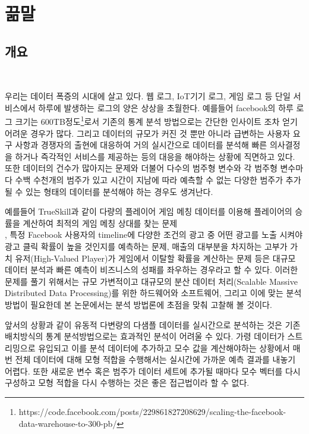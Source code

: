 \documentclass[oneside,b5paper,11pt]{book}
\theoremstyle{plain}
\theoremstyle{definition}
\theoremstyle{remark}
\theoremstyle{definition}
\numberwithin{equation}{chapter}
\begin{document}
%
%
\chapter{끎말}

\section{개요}
{}\

 우리는 데이터 폭증의 시대에 살고 있다. 웹 로그, IoT기기 로그, 게임 로그 등 단일 서비스에서 하루에 발생하는 로그의 양은 상상을 초월한다. 예를들어 facebook의 하루 로그 크기는 600TB정도\footnote{https://code.facebook.com/posts/229861827208629/scaling-the-facebook-data-warehouse-to-300-pb/}로서 기존의 통계 분석 방법으로는 간단한 인사이트 조차 얻기 어려운 경우가 많다. 그리고 데이터의 규모가 커진 것 뿐만 아니라 급변하는 사용자 요구 사항과 경쟁자의 출현에 대응하여 거의 실시간으로 데이터를 분석해 빠른 의사결정을 하거나 즉각적인 서비스를 제공하는 등의 대응을 해야하는 상황에 직면하고 있다. 또한 데이터의 건수가 많아지는 문제와 더불어 다수의 범주형 변수와 각 범주형 변수마다 수백 수천개의 범주가 있고 시간이 지남에 따라 예측할 수 없는 다양한 범주가 추가될 수 있는 형태의 데이터를 분석해야 하는 경우도 생겨난다.

 예를들어 TrueSkill과 같이 다량의 플레이어 게임 메칭 데이터를 이용해 플레이어의 승률을 계산하여 최적의 게임 메칭 상대를 찾는 문제\\ \citep{Herbrich2006}, 특정 Facebook 사용자의 timeline에 다양한 조건의 광고 중 어떤 광고를 노출 시켜야 광고 클릭 확률이 높을 것인지를 예측하는 문제\citep{He2014}, 매출의 대부분을 차지하는 고부가 가치 유저(High-Valued Player)가 게임에서 이탈할 확률을 계산하는 문제\citep{Runge2014} 등은 대규모 데이터 분석과 빠른 예측이 비즈니스의 성패를 좌우하는 경우라고 할 수 있다. 이러한 문제를 풀기 위해서는 규모 가변적이고 대규모의 분산 데이터 처리(Scalable Massive Distributed Data Processing)를 위한 하드웨어와 소프트웨어, 그리고 이에 맞는 분석 방법이 필요한데 본 논문에서는 분석 방법론에 초점을 맞춰 고찰해 볼 것이다.

 앞서의 상황과 같이 유동적 다변량의 다샘플 데이터를 실시간으로 분석하는 것은 기존 배치방식의 통계 분석방법으로는 효과적인 분석이 어려울 수 있다. 가령 데이터가 스트리밍으로 유입되고 이를 분석 데이터에 추가하고 모수 값을 계산해야하는 상황에서 매번 전체 데이터에 대해 모형 적합을 수행해서는 실시간에 가까운 예측 결과를 내놓기 어렵다. 또한 새로운 변수 혹은 범주가 데이터 세트에 추가될 때마다 모수 벡터를 다시 구성하고 모형 적합을 다시 수행하는 것은 좋은 접근법이라 할 수 없다.
\end{document}
